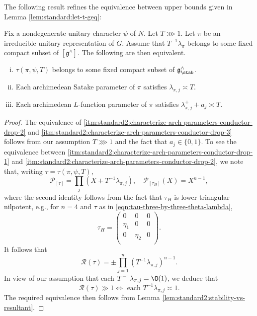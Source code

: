 The following result refines the equivalence between upper bounds given in Lemma \ref{lem:standard:let-t-geq}:
\begin{lemma}\label{lem:standard2:no-conductor-drop-vs-tau}
  Fix a nondegenerate unitary character $\psi$ of $N$.  Let $T \ggg 1$.  Let $\pi$ be an irreducible unitary representation of $G$.  Assume that $T^{-1} \lambda_\pi$ belongs to some fixed compact subset of $[\mathfrak{g}^\wedge]$.  The following are then equivalent.
  \begin{enumerate}[(i)]
  \item
    \label{itm:standard2:characterize-arch-parameters-conductor-drop-1} $\tau(\pi,\psi,T)$ belongs to some fixed compact subset of $\mathfrak{g}^\wedge_{\stab}$.
  \item \label{itm:standard2:characterize-arch-parameters-conductor-drop-2} Each archimedean Satake parameter of $\pi$ satisfies $\lambda_{\pi,j} \asymp T$.
  \item \label{itm:standard2:characterize-arch-parameters-conductor-drop-3} Each archimedean $L$-function parameter of $\pi$ satisfies $\lambda_{\pi,j}^+ + a_j \asymp T$.
  \end{enumerate}
\end{lemma}
\begin{proof}
  The equivalence of \eqref{itm:standard2:characterize-arch-parameters-conductor-drop-2} and \eqref{itm:standard2:characterize-arch-parameters-conductor-drop-3} follows from our assumption $T \ggg 1$ and the fact that $a_j \in \{0,1\}$.  To see the equivalence between \eqref{itm:standard2:characterize-arch-parameters-conductor-drop-1} and \eqref{itm:standard2:characterize-arch-parameters-conductor-drop-2}, we note that, writing $\tau = \tau(\pi,\psi,T)$,
  \begin{equation*}
    \mathcal{P}_{[\tau]} = \prod_j (X + T^{-1} \lambda_{\pi,j}),
    \quad
    \mathcal{P}_{[\tau_H]}(X) = X^{n-1},
  \end{equation*}
  where the second identity follows from the fact that $\tau_H$ is lower-triangular nilpotent, e.g., for $n = 4$ and $\tau$ as in \eqref{eqn:tau-three-by-three-theta-lambda},
  \begin{equation*}
    \tau_H =
    \begin{pmatrix}
      0      & 0 & 0 \\
      \eta_1 & 0 & 0 \\
      0 & \eta_2 & 0 \\
    \end{pmatrix}.
  \end{equation*}
  It follows that
  \begin{equation*}
    \mathcal{R}(\tau) = \pm \prod_{j=1}^n (T^{-1} \lambda_{\pi,j})^{n-1}.
  \end{equation*}
  In view of our assumption that each $T^{-1} \lambda_{\pi, j} = \O(1)$, we deduce that
  \begin{equation*}
    \mathcal{R}(\tau) \gg 1 \iff \text{ each } T^{-1} \lambda_{\pi,j} \asymp 1.
  \end{equation*}
  The required equivalence then follows from Lemma \ref{lem:standard2:stability-vs-resultant}.
\end{proof}




